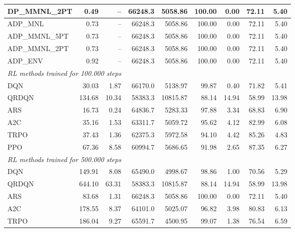 \begin{samepage}
\begin{center}
\begin{tabular}{l|rr|rr|rr|rr}
    DP\_MMNL\_2PT &     0.49 &    -- &    66248.3 &    5058.86 &  100.00 &    0.00 &   72.11 &    5.40 \\
    \midrule
    ADP\_MNL     &     0.73 &    -- &    66248.3 &    5058.86 &  100.00 &    0.00 &   72.11 &    5.40 \\
    ADP\_MMNL\_5PT &     0.73 &    -- &    66248.3 &    5058.86 &  100.00 &    0.00 &   72.11 &    5.40 \\
    ADP\_MMNL\_2PT &     0.73 &    -- &    66248.3 &    5058.86 &  100.00 &    0.00 &   72.11 &    5.40 \\
    ADP\_ENV     &     0.92 &    -- &    66248.3 &    5058.86 &  100.00 &    0.00 &   72.11 &    5.40 \\
    \midrule
    \multicolumn{9}{l}{\textit{RL methods trained for 100.000 steps}} \\
    \midrule
    DQN          &    30.03 &     1.87 &    66170.0 &    5138.97 &   99.87 &    0.40 &   71.82 &    5.41 \\
    QRDQN        &   134.68 &    10.34 &    58383.3 &   10815.87 &   88.14 &   14.94 &   58.99 &   13.98 \\
    ARS          &    16.73 &     0.24 &    64836.7 &    5283.33 &   97.88 &    3.34 &   68.83 &    6.90 \\
    A2C          &    35.16 &     1.53 &    63311.7 &    5059.72 &   95.62 &    4.12 &   82.99 &    6.08 \\
    TRPO         &    37.43 &     1.36 &    62375.3 &    5972.58 &   94.10 &    4.42 &   85.26 &    4.83 \\
    PPO          &    67.36 &     8.58 &    60994.7 &    5686.65 &   91.98 &    2.65 &   87.35 &    6.27 \\
    \midrule
    \multicolumn{9}{l}{\textit{RL methods trained for 500.000 steps}} \\
    \midrule
    DQN          &   149.91 &     8.08 &    65490.0 &    4998.67 &   98.86 &    1.00 &   70.56 &    5.29 \\
    QRDQN        &   644.10 &    63.31 &    58383.3 &   10815.87 &   88.14 &   14.94 &   58.99 &   13.98 \\
    ARS          &    83.68 &     1.31 &    66248.3 &    5058.86 &  100.00 &    0.00 &   72.11 &    5.40 \\
    A2C          &   178.55 &     8.37 &    64101.0 &    5025.07 &   96.82 &    3.98 &   80.83 &    6.13 \\
    TRPO         &   186.04 &     9.27 &    65591.7 &    4500.95 &   99.07 &    1.38 &   76.54 &    6.59 \\

\end{tabular}
\end{center}
\end{samepage}
